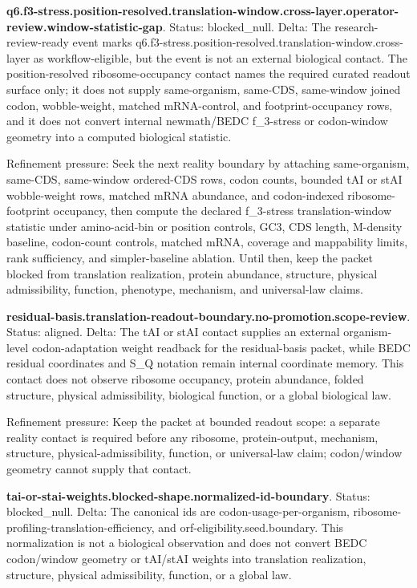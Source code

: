 \textbf{q6.f3-stress.position-resolved.translation-window.cross-layer.operator-review.window-statistic-gap}. Status: blocked\_null. Delta: The research-review-ready event marks q6.f3-stress.position-resolved.translation-window.cross-layer as workflow-eligible, but the event is not an external biological contact. The position-resolved ribosome-occupancy contact names the required curated readout surface only; it does not supply same-organism, same-CDS, same-window joined codon, wobble-weight, matched mRNA-control, and footprint-occupancy rows, and it does not convert internal newmath/BEDC f\_3-stress or codon-window geometry into a computed biological statistic.

Refinement pressure: Seek the next reality boundary by attaching same-organism, same-CDS, same-window ordered-CDS rows, codon counts, bounded tAI or stAI wobble-weight rows, matched mRNA abundance, and codon-indexed ribosome-footprint occupancy, then compute the declared f\_3-stress translation-window statistic under amino-acid-bin or position controls, GC3, CDS length, M-density baseline, codon-count controls, matched mRNA, coverage and mappability limits, rank sufficiency, and simpler-baseline ablation. Until then, keep the packet blocked from translation realization, protein abundance, structure, physical admissibility, function, phenotype, mechanism, and universal-law claims.

\textbf{residual-basis.translation-readout-boundary.no-promotion.scope-review}. Status: aligned. Delta: The tAI or stAI contact supplies an external organism-level codon-adaptation weight readback for the residual-basis packet, while BEDC residual coordinates and S\_Q notation remain internal coordinate memory. This contact does not observe ribosome occupancy, protein abundance, folded structure, physical admissibility, biological function, or a global biological law.

Refinement pressure: Keep the packet at bounded readout scope: a separate reality contact is required before any ribosome, protein-output, mechanism, structure, physical-admissibility, function, or universal-law claim; codon/window geometry cannot supply that contact.

\textbf{tai-or-stai-weights.blocked-shape.normalized-id-boundary}. Status: blocked\_null. Delta: The canonical ids are codon-usage-per-organism, ribosome-profiling-translation-efficiency, and orf-eligibility.seed.boundary. This normalization is not a biological observation and does not convert BEDC codon/window geometry or tAI/stAI weights into translation realization, structure, physical admissibility, function, or a global law.

